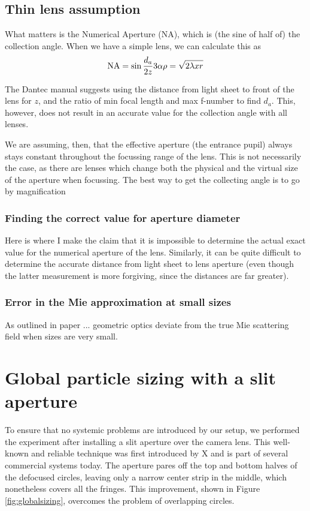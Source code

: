 \documentclass[10pt]{book}
\begin{document}
\section{Thin lens assumption}
What matters is the Numerical Aperture (NA), which is (the sine of half of) the
collection angle. When we have a simple lens, we can calculate this as
\begin{equation}
    \mathrm{NA} = \sin \frac{d_a}{2z}\\
    3\alpha \rho = \sqrt{2 \lambda x r}
\end{equation}

The Dantec manual suggests using the distance from light sheet to front of the
lens for $z$, and the ratio of min focal length and max f-number to find $d_a$.
This, however, does not result in an accurate value for the collection angle
with all lenses.

We are assuming, then, that the effective aperture (the entrance pupil) always
stays constant throughout the focussing range of the lens. This is not
necessarily the case, as there are lenses which change both the physical and the
virtual size of the aperture when focussing. The best way to get the collecting
angle is to go by magnification

\subsection{Finding the correct value for aperture diameter}
Here is where I make the claim that it is impossible to determine the actual
exact value for the numerical aperture of the lens. Similarly, it can be quite
difficult to determine the accurate distance from light sheet to lens aperture
(even though the latter measurement is more forgiving, since the distances are
far greater).

\subsection{Error in the Mie approximation at small sizes}
As outlined in paper ... geometric optics deviate from the true Mie scattering
field when sizes are very small.

\chapter{Global particle sizing with a slit aperture}
To ensure that no systemic problems are introduced by our
setup, we performed the experiment after installing a slit aperture over the
camera lens. This well-known and reliable technique was first introduced by X
\cite{X} and is part of several commercial systems today. The aperture pares off the top
and bottom halves of the defocused circles, leaving only a narrow center strip
in the middle, which nonetheless covers all the fringes. This improvement, shown
in Figure \ref{fig:globalsizing}, overcomes the problem of overlapping circles.
\end{document}

